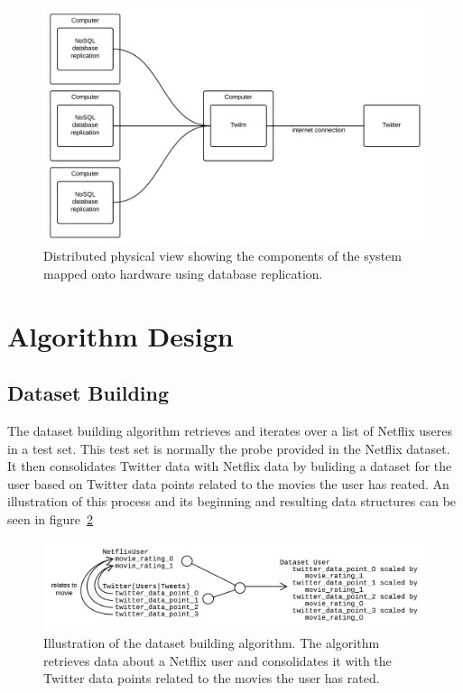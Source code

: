 \begin{figure}[H]
\centerline{\includegraphics[width=4.5in]{image/architecture-physical-view-distributed.png}}
\caption{Distributed physical view showing the components of the system mapped onto hardware using database replication.}
\label{figure:development-view}
\end{figure}

\section{Algorithm Design}
\subsection{Dataset Building}\label{algorithm-design:dataset-building}
The dataset building algorithm retrieves and iterates over a list of Netflix useres in a test set. This test set is normally the probe provided in the Netflix dataset. It then consolidates Twitter data with Netflix data by buliding a dataset for the user based on Twitter data points related to the movies the user has reated. An illustration of this process and its beginning and resulting data structures can be seen in figure~\ref{figure:dataset-building-algorithm}

\begin{figure}[H]
\centerline{\includegraphics[width=6in]{image/design-algorithm-dataset-building.png}}
\caption{Illustration of the dataset building algorithm. The algorithm retrieves data about a Netflix user and consolidates it with the Twitter data points related to the movies the user has rated.}
\label{figure:dataset-building-algorithm}
\end{figure}

